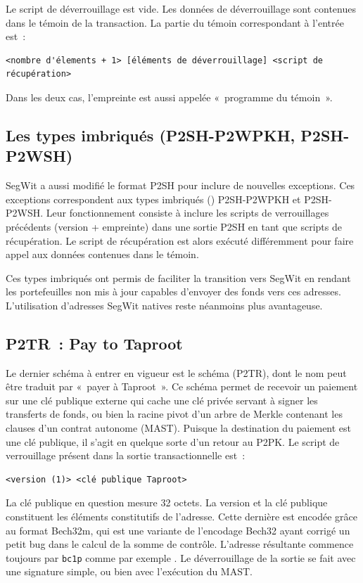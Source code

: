 Le script de déverrouillage est vide. Les données de déverrouillage sont contenues dans le témoin de la transaction. La partie du témoin correspondant à l'entrée est~:

\begin{Verbatim}[fontsize=\footnotesize]
<nombre d'élements + 1> [éléments de déverrouillage] <script de
récupération>
\end{Verbatim}

Dans les deux cas, l'empreinte est aussi appelée «~programme du témoin~».

\subsection{Les types imbriqués (P2SH-P2WPKH, P2SH-P2WSH)} SegWit a aussi modifié le format P2SH pour inclure de nouvelles exceptions. Ces exceptions correspondent aux types imbriqués () P2SH-P2WPKH et P2SH-P2WSH. Leur fonctionnement consiste à inclure les scripts de verrouillages précédents (version + empreinte) dans une sortie P2SH en tant que scripts de récupération. Le script de récupération est alors exécuté différemment pour faire appel aux données contenues dans le témoin.

Ces types imbriqués ont permis de faciliter la transition vers SegWit en rendant les portefeuilles non mis à jour capables d'envoyer des fonds vers ces adresses. L'utilisation d'adresses SegWit natives reste néanmoins plus avantageuse.

\subsection{P2TR~: Pay to Taproot} Le dernier schéma à entrer en vigueur est le schéma  (P2TR), dont le nom peut être traduit par «~payer à Taproot~». Ce schéma permet de recevoir un paiement sur une clé publique externe qui cache une clé privée servant à signer les transferts de fonds, ou bien la racine pivot d'un arbre de Merkle contenant les clauses d'un contrat autonome (MAST). Puisque la destination du paiement est une clé publique, il s'agit en quelque sorte d'un retour au P2PK. Le script de verrouillage présent dans la sortie transactionnelle est~:

\begin{Verbatim}[fontsize=\footnotesize]
<version (1)> <clé publique Taproot>
\end{Verbatim}

La clé publique en question mesure 32 octets. La version et la clé publique constituent les éléments constitutifs de l'adresse. Cette dernière est encodée grâce au format Bech32m, qui est une variante de l'encodage Bech32 ayant corrigé un petit bug dans le calcul de la somme de contrôle. L'adresse résultante commence toujours par \texttt{bc1p} comme par exemple . Le déverrouillage de la sortie se fait avec une signature simple, ou bien avec l'exécution du MAST.

